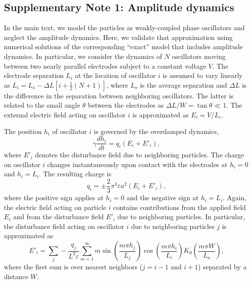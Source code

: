 \begin{appendices}
\subsection{Supplementary Note 1: Amplitude dynamics}

In the main text, we model the particles as weakly-coupled phase oscillators and neglect the amplitude dynamics.  Here, we validate that approximation using numerical solutions of the corresponding ``exact'' model that includes amplitude dynamics.  In particular, we consider the dynamics of $N$ oscillators moving between two nearly parallel electrodes subject to a constant voltage $V$.  The electrode separation $L_i$ at the location of oscillator $i$ is assumed to vary linearly as $L_i=L_o - \Delta L[i + \tfrac{1}{2}(N+1)]$, where $L_o$ is the average separation and $\Delta L$ is the difference in the separation between neighboring oscillators.  The latter is related to the small angle $\theta$ between the electrodes as  $\Delta L / W =  \tan\theta \ll1$.  The external electric field acting on oscillator $i$ is approximated as $E_i=V/L_i$.

The position $h_i$ of oscillator $i$ is governed by the overdamped dynamics,
\begin{equation}
    \gamma \frac{d h_i}{d t} = q_i (E_i + E'_i),
\end{equation}
where $E'_i$ denotes the disturbance field due to neighboring particles.  The charge on oscillator $i$ changes instantaneously upon contact with the electrodes at $h_i=0$ and $h_i=L_i$. The resulting charge is
\begin{equation}
    q_i = \pm \frac{2}{3}\pi^3 \varepsilon a^2 (E_i + E'_i),
\end{equation}
where the positive sign applies at $h_i=0$ and the negative sign at $h_i=L_i$.  Again, the electric field acting on particle $i$ contains contributions from the applied field $E_i$ and from the disturbance field $E'_i$ due to neighboring particles.  In particular, the disturbance field acting on oscillator $i$ due to neighboring particles $j$ is approximated as
\begin{equation}
    E'_i = \sum_j -\frac{q_j}{L^2 \varepsilon} \sum_{m=1}^{\infty} m \sin\left(\frac{m\pi h_j}{L_j}\right) \cos\left(\frac{m\pi h_i }{L_i}\right) K_0\left(\frac{m \pi W}{L_o}\right),
\end{equation}
where the first sum is over nearest neighbors ($j=i-1$ and $i+1$) separated by a distance $W$.


\end{appendices}
